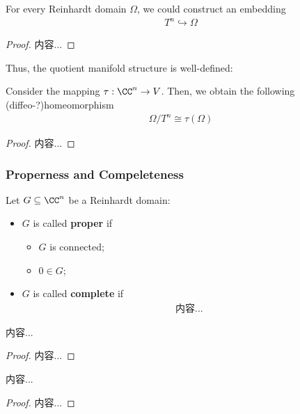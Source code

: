 \documentclass[Total.tex]{subfiles}
\begin{document}
		\begin{lemma}
			For every Reinhardt domain $\Omega$, we could construct an embedding
			\begin{gather*}
				T^n\hookrightarrow \Omega
			\end{gather*}
		\end{lemma}
		\begin{proof}
			内容...
		\end{proof}
		
		Thus, the quotient manifold structure is well-defined:
		
		\begin{proposition}
			Consider the mapping $\tau:\CC^n\rightarrow V$. Then, we obtain the following (diffeo-?)homeomorphism
			\begin{gather*}
				\Omega/T^n\cong \tau(\Omega)
			\end{gather*}
		\end{proposition}
		\begin{proof}
			内容...
		\end{proof}
		
		\subsubsection{Properness and Compeleteness}
		\begin{Def}
			Let $G\subseteq \CC^n$ be a Reinhardt domain:
			\begin{itemize}
				\item $G$ is called \textbf{proper} if
				\begin{itemize}
					\item $G$ is connected;
					\item $0\in G$;
				\end{itemize}
				\item $G$ is called \textbf{complete} if
				\begin{gather*}
					内容...
				\end{gather*}
			\end{itemize}
		\end{Def}
		\begin{proposition}
			内容...
		\end{proposition}
		\begin{proof}
			内容...
		\end{proof}
		
		\begin{theorem}
			内容...
		\end{theorem}
		\begin{proof}
			内容...
		\end{proof}
		
\end{document}
